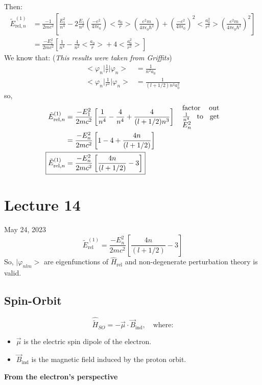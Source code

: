\documentclass[12pt,fancychapters]{report}
\numberwithin{equation}{section}
\begin{document}
Then:
\begin{align*}
  \tilde{E}^{(1)}_{\text{rel},n} &= \frac{-1}{2mc^2} \left[\frac{E_1^2}{n^4} - 2\frac{E_1}{n^2}
      \left(\frac{-e^2}{4\pi\epsilon_0}\right)\bigg<\frac{a_0}{r}\bigg>\left(\frac{e^2m}
      {4\pi\epsilon_0\hbar^2}\right) + 
  \left(\frac{-e^2}{4\pi\epsilon_0}\right)^2\bigg<\frac{a_0^2}{r^2}\bigg>\left(\frac{e^2m}
{4\pi\epsilon_0\hbar^2}\right)^2 \right]\\
&=\boxed{ \frac{-E_1^2}{2mc^2}\left[\frac{1}{n^4}-\frac{4}{n^2}\bigg<\frac{a_0}{r}\bigg>+
4\bigg<\frac{a_0^2}{r^2}\bigg>\right]}
\end{align*}
We know that: (\emph{This results were taken from Griffits})
\begin{align*}
  \bigg<\varphi_n\bigg|\frac{1}{r}\bigg|\varphi_n\bigg> &= \frac{1}{n^2 a_0}\\
  \bigg<\varphi_n\bigg|\frac{1}{r^2}\bigg|\varphi_n\bigg> &= \frac{1}{(l+1/2)n^3 a_0^2}
\end{align*}
so,
\begin{align*}
  \tilde{E}^{(1)}_{\text{rel},n} &= \frac{-E_1^2}{2mc^2}\left[\frac{1}{n^4}
  -\frac{4}{n^4}+\frac{4}{(l+1/2) n^3}\right]\quad \parbox{0.15\textwidth}{factor out $\frac{1}
{n^4}$ to get $E_n^2$}\\
    &=\frac{-E_n^2}{2mc^2}\left[1-4+\frac{4n}
    {(l+1/2)}\right]\\
\Aboxed{\tilde{E}^{(1)}_{\text{rel},n} &=\frac{-E_n^2}{2mc^2}\left[\frac{4n}
    {(l+1/2)}-3\right]}
\end{align*}
\newpage
\section{Lecture 14}
May 24, 2023
\begin{equation}
  \boxed{\tilde{E}^{(1)}_{\text{rel}} =\frac{-E_n^2}{2mc^2}\left[\frac{4n}
  {(l+1/2)}-3\right]}
  \end{equation}
So, $\big|\varphi_{nlm}\big>$ are eigenfunctions of $\hat{H}_\text{rel}$ and non-degenerate 
perturbation theory is valid.
\subsection{Spin-Orbit}
\[
  \hat{\tilde{H}}_{SO} = -\vec{\mu}\cdot \vec{B}_\text{ind}, \quad \text{where:}
\]
\begin{itemize}
  \item $\vec{\mu}$ is the electric spin dipole of the electron.
  \item $\vec{B}_\text{ind}$ is the magnetic field induced by the proton orbit.
\end{itemize}
\textbf{From the electron's perspective}
\end{document}
